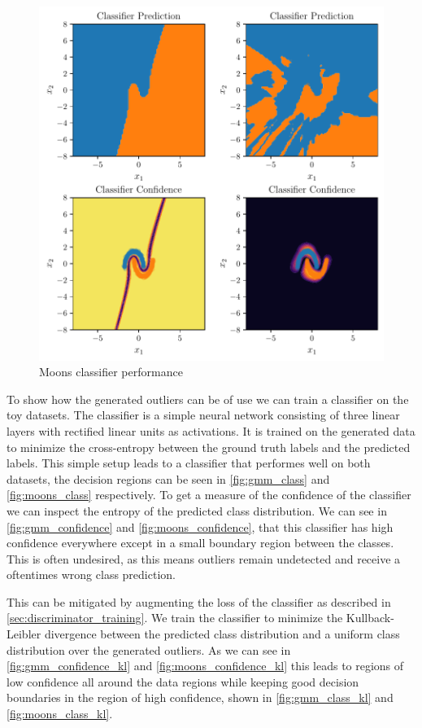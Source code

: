 \begin{figure}[htpb]
	\centering
        \includegraphics{figures/toy_example/moons/classifier.pdf}
	\caption{Moons classifier performance}%
	\label{fig:classifier_moons}
\end{figure}

To show how the generated outliers can be of use we can train a classifier on
the toy datasets. The classifier is a simple neural network consisting of three
linear layers with rectified linear units as activations. It is trained on the
generated data to minimize the cross-entropy between the ground truth labels
and the predicted labels. This simple setup leads to a classifier that
performes well on both datasets, the decision regions can be seen in
\autoref{fig:gmm_class} and \autoref{fig:moons_class} respectively. To get a
measure of the confidence of the classifier we can inspect the entropy of the
predicted class distribution. We can see in \autoref{fig:gmm_confidence} and
\autoref{fig:moons_confidence}, that this classifier has high confidence
everywhere except in a small boundary region between the classes. This is often
undesired, as this means outliers remain undetected and receive a oftentimes
wrong class prediction.

This can be mitigated by augmenting the loss of the classifier as described in
\autoref{sec:discriminator_training}. We train the classifier to minimize the
Kullback-Leibler divergence between the predicted class distribution and a
uniform class distribution over the generated outliers. As we can see in
\autoref{fig:gmm_confidence_kl} and \autoref{fig:moons_confidence_kl} this
leads to regions of low confidence all around the data regions while keeping
good decision boundaries in the region of high confidence, shown in
\autoref{fig:gmm_class_kl} and \autoref{fig:moons_class_kl}.


